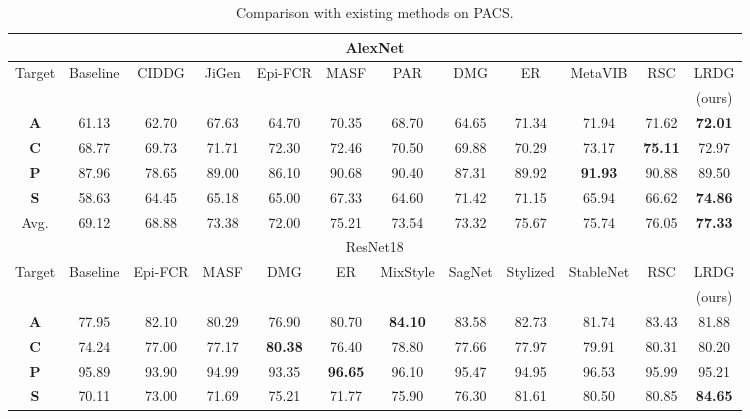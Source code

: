 \documentclass{article}
\begin{document}
\setlength{\tabcolsep}{4.8pt}
\begin{table}[ht]
\caption{Comparison with existing methods on PACS.}
\begin{center}
\scriptsize
\begin{tabular}{c|cccccccccc|c}
\hline
\multicolumn{12}{c}{AlexNet}\\
\hline
\multirow{2}{*}{Target} & Baseline & CIDDG & JiGen  & Epi-FCR & MASF & PAR & DMG & ER  & MetaVIB & RSC & LRDG\\
&  & \cite{li2018deep} & \cite{carlucci2019domain} & \cite{li2019episodic} & \cite{dou2019domain} & \cite{wang2019learning} & \cite{chattopadhyay2020learning} & \cite{zhao2020domain} & \cite{du2020learning} & \cite{huangRSC2020} & (ours) \\
\hline
\textbf{A} & 61.13 & 62.70 & 67.63 & 64.70 & 70.35 & 68.70 & 64.65 & 71.34 & 71.94 & 71.62 & \textbf{72.01}\\
\textbf{C} & 68.77 & 69.73 & 71.71 & 72.30 & 72.46 & 70.50 & 69.88 & 70.29 & 73.17 & \textbf{75.11} & 72.97\\
\textbf{P} & 87.96 & 78.65 & 89.00 & 86.10 & 90.68 & 90.40 & 87.31 & 89.92 & \textbf{91.93} & 90.88 & 89.50 \\
\textbf{S} & 58.63 & 64.45 & 65.18 & 65.00 & 67.33 & 64.60 & 71.42 & 71.15 & 65.94 & 66.62 & \textbf{74.86}\\
Avg. & 69.12 & 68.88 & 73.38 & 72.00 & 75.21 & 73.54 & 73.32 & 75.67 & 75.74 & 76.05 & \textbf{77.33}\\
\hline
\hline
\multicolumn{12}{c}{ResNet18}\\
\hline
\multirow{2}{*}{Target} & Baseline  & Epi-FCR & MASF & DMG & ER & MixStyle & SagNet & Stylized & StableNet & RSC & LRDG\\
&  & \cite{li2019episodic} & \cite{dou2019domain} & \cite{chattopadhyay2020learning} & \cite{zhao2020domain} & \cite{zhou2020domain} & \cite{nam2021reducing} & \cite{borlino2021rethinking} & \cite{zhang2021deep} & \cite{huangRSC2020} & (ours) \\
\hline
\textbf{A} & 77.95 & 82.10 & 80.29 & 76.90 & 80.70 & \textbf{84.10} & 83.58 & 82.73 & 81.74 & 83.43 & 81.88\\
\textbf{C} & 74.24 & 77.00 & 77.17 & \textbf{80.38} & 76.40 & 78.80 & 77.66 & 77.97 & 79.91 & 80.31 & 80.20\\
\textbf{P} & 95.89 & 93.90 & 94.99 & 93.35 & \textbf{96.65} & 96.10 & 95.47 & 94.95 & 96.53 & 95.99 & 95.21\\
\textbf{S} & 70.11 & 73.00 & 71.69 & 75.21 & 71.77 & 75.90 & 76.30 & 81.61 & 80.50 & 80.85 & \textbf{84.65}\\

\end{tabular}
\end{center}
\end{table}
\end{document}
